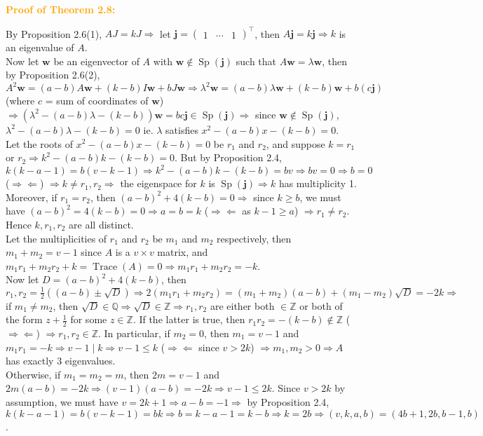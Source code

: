 \documentclass[12pt]{article}
\newcommand{\noparskip}{\vspace{-\parskip}}
\newenvironment{dent}
	{\begin{adjustwidth}{15pt}{}\noparskip}
	{\end{adjustwidth}}
\newenvironment{proof}[1]
	{\textcolor{Orange}{\textbf{Proof of #1:}}\begin{dent}}
	{\end{dent}}
\renewcommand{\implies}{\Rightarrow}
\newcommand{\contradiction}{\Rightarrow \Leftarrow}
\newcommand{\Z}{\mathbb{Z}}
\newcommand{\Q}{\mathbb{Q}}
\newcommand{\trace}[1]{\operatorname{Trace}(#1)}
\renewcommand{\span}[1]{\operatorname{Sp}(#1)}
\renewcommand{\vec}[1]{\mathbf{#1}}
\begin{document}
\begin{proof}{Theorem 2.8}
By Proposition 2.6(1), $AJ = kJ \implies$ let $\vec{j} = \begin{pmatrix} 1 & \cdots & 1 \end{pmatrix}^\top$, then $A\vec{j} = k\vec{j} \implies k$ is an eigenvalue of $A$. \\
Now let $\vec{w}$ be an eigenvector of $A$ with $\vec{w} \notin \span{\vec{j}}$ such that $A\vec{w} = \lambda \vec{w}$, then by Proposition 2.6(2), $A^2 \vec{w} = (a - b)A\vec{w} + (k - b)I\vec{w} + bJ\vec{w} \implies \lambda^2 \vec{w} = (a - b) \lambda \vec{w} + (k - b) \vec{w} + b(c\vec{j})$ (where $c$ = sum of coordinates of $\vec{w}$) $\implies (\lambda^2 - (a - b) \lambda - (k - b)) \vec{w} = bc\vec{j} \in \span{\vec{j}} \implies$ since $\vec{w} \notin \span{\vec{j}}$, $\lambda^2 - (a - b) \lambda - (k - b) = 0$ ie. $\lambda$ satisfies $x^2 - (a - b)x - (k - b) = 0$. \\
Let the roots of $x^2 - (a - b)x - (k - b) = 0$ be $r_1$ and $r_2$, and suppose $k = r_1$ or $r_2 \implies k^2 - (a - b)k - (k - b) = 0$. But by Proposition 2.4, $k(k - a - 1) = b(v - k - 1) \implies k^2 - (a - b)k - (k - b) = bv \implies bv = 0 \implies b = 0$ ($\contradiction$) $\implies k \ne r_1, r_2 \implies$ the eigenspace for $k$ is $\span{\vec{j}} \implies k$ has multiplicity 1. Moreover, if $r_1 = r_2$, then $(a - b)^2 + 4(k - b) = 0 \implies$ since $k \ge b$, we must have $(a - b)^2 = 4(k - b) = 0 \implies a = b = k$ ($\contradiction$ as $k - 1 \ge a$) $\implies r_1 \ne r_2$. Hence $k ,r_1, r_2$ are all distinct. \\
Let the multiplicities of $r_1$ and $r_2$ be $m_1$ and $m_2$ respectively, then $m_1 + m_2 = v - 1$ since $A$ is a $v \times v$ matrix, and $m_1 r_1 + m_2 r_2 + k = \trace{A} = 0 \implies m_1 r_1 + m_2 r_2 = -k$. \\
Now let $D = (a - b)^2 + 4(k - b)$, then $r_1, r_2 = \frac{1}{2} ((a - b) \pm \sqrt{D}) \implies 2(m_1 r_1 + m_2 r_2) = (m_1 + m_2)(a - b) + (m_1 - m_2) \sqrt{D} = -2k \implies$ if $m_1 \ne m_2$, then $\sqrt{D} \in \Q \implies \sqrt{D} \in \Z \implies r_1, r_2$ are either both $\in \Z$ or both of the form $z + \frac{1}{2}$ for some $z \in \Z$. If the latter is true, then $r_1 r_2 = -(k - b) \notin \Z$ ($\contradiction$) $\implies r_1, r_2 \in \Z$. In particular, if $m_2 = 0$, then $m_1 = v - 1$ and $m_1 r_1 = -k \implies v - 1 \mid k \implies v - 1 \le k$ ($\contradiction$ since $v > 2k$) $\implies m_1, m_2 > 0 \implies A$ has exactly 3 eigenvalues. \\
Otherwise, if $m_1 = m_2 = m$, then $2m = v - 1$ and $2m(a - b) = -2k \implies (v - 1)(a - b) = -2k \implies v - 1 \le 2k$. Since $v > 2k$ by assumption, we must have $v = 2k + 1 \implies a - b = -1 \implies$ by Proposition 2.4, $k(k - a - 1) = b(v - k - 1) = bk \implies b = k - a - 1 = k - b \implies k = 2b \implies (v, k, a, b) = (4b + 1, 2b, b - 1, b)$.
\end{proof}
\end{document}
